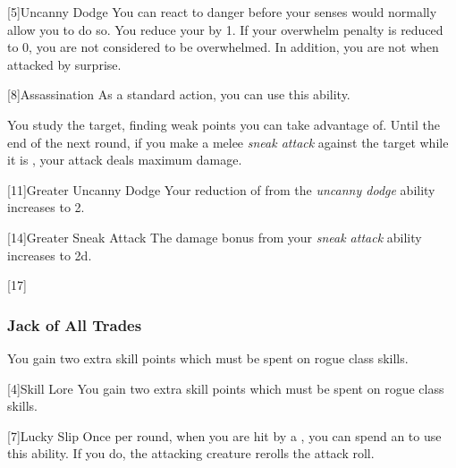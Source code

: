             [5]{Uncanny Dodge} You can react to danger before your senses would normally allow you to do so.
            You reduce your  by 1.
            If your overwhelm penalty is reduced to 0, you are not considered to be overwhelmed.
            In addition, you are not \unaware when attacked by surprise.

            [8]{Assassination} As a standard action, you can use this ability.
            \begin{ability}
                \begin{spelltargetinginfo}
                \end{spelltargetinginfo}
                \begin{spelleffects}
                    \spelleffect You study the target, finding weak points you can take advantage of.
                    Until the end of the next round, if you make a melee \textit{sneak attack} against the target while it is \unaware, your attack deals maximum damage.
                \end{spelleffects}
            \end{ability}

            [11]{Greater Uncanny Dodge}
            Your reduction of  from the \textit{uncanny dodge} ability increases to 2.

            [14]{Greater Sneak Attack}
            The damage bonus from your \textit{sneak attack} ability increases to \plus2d.

            [17]{} 

        \subsubsection{Jack of All Trades}

             You gain two extra skill points which must be spent on rogue class skills.

            [4]{Skill Lore} You gain two extra skill points which must be spent on rogue class skills.

            [7]{Lucky Slip} Once per round, when you are hit by a , you can spend an  to use this ability.
            If you do, the attacking creature rerolls the attack roll.

